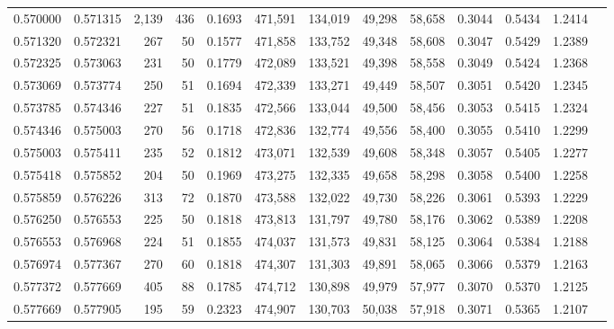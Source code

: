 \begin{tabular}{rrrrrrrrrrrrr}
0.570000 & 0.571315 & 2,139 & 436 &                                     0.1693 & 471,591 & 134,019 &  49,298 &  58,658 & 0.3044 & 0.5434 & 1.2414 \\
0.571320 & 0.572321 &   267 &  50 &                                     0.1577 & 471,858 & 133,752 &  49,348 &  58,608 & 0.3047 & 0.5429 & 1.2389 \\
0.572325 & 0.573063 &   231 &  50 &                                     0.1779 & 472,089 & 133,521 &  49,398 &  58,558 & 0.3049 & 0.5424 & 1.2368 \\
0.573069 & 0.573774 &   250 &  51 &                                     0.1694 & 472,339 & 133,271 &  49,449 &  58,507 & 0.3051 & 0.5420 & 1.2345 \\
0.573785 & 0.574346 &   227 &  51 &                                     0.1835 & 472,566 & 133,044 &  49,500 &  58,456 & 0.3053 & 0.5415 & 1.2324 \\
0.574346 & 0.575003 &   270 &  56 &                                     0.1718 & 472,836 & 132,774 &  49,556 &  58,400 & 0.3055 & 0.5410 & 1.2299 \\
0.575003 & 0.575411 &   235 &  52 &                                     0.1812 & 473,071 & 132,539 &  49,608 &  58,348 & 0.3057 & 0.5405 & 1.2277 \\
0.575418 & 0.575852 &   204 &  50 &                                     0.1969 & 473,275 & 132,335 &  49,658 &  58,298 & 0.3058 & 0.5400 & 1.2258 \\
0.575859 & 0.576226 &   313 &  72 &                                     0.1870 & 473,588 & 132,022 &  49,730 &  58,226 & 0.3061 & 0.5393 & 1.2229 \\
0.576250 & 0.576553 &   225 &  50 &                                     0.1818 & 473,813 & 131,797 &  49,780 &  58,176 & 0.3062 & 0.5389 & 1.2208 \\
0.576553 & 0.576968 &   224 &  51 &                                     0.1855 & 474,037 & 131,573 &  49,831 &  58,125 & 0.3064 & 0.5384 & 1.2188 \\
0.576974 & 0.577367 &   270 &  60 &                                     0.1818 & 474,307 & 131,303 &  49,891 &  58,065 & 0.3066 & 0.5379 & 1.2163 \\
0.577372 & 0.577669 &   405 &  88 &                                     0.1785 & 474,712 & 130,898 &  49,979 &  57,977 & 0.3070 & 0.5370 & 1.2125 \\
0.577669 & 0.577905 &   195 &  59 &                                     0.2323 & 474,907 & 130,703 &  50,038 &  57,918 & 0.3071 & 0.5365 & 1.2107 \\

\end{tabular}
